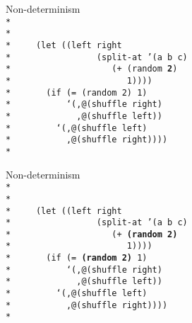 \begin{frame}{Non-determinism}
  \texttt{
    \ \\*
    \ \\*
    \ \\*
    \ \ \ \ (let ((left right\\*
    \ \ \ \ \ \ \ \ \ \ \ \ \ \ \ \ (split-at '(a b c)\\*
    \ \ \ \ \ \ \ \ \ \ \ \ \ \ \ \ \ \ \ (+ (random \textbf{2})\\*
    \ \ \ \ \ \ \ \ \ \ \ \ \ \ \ \ \ \ \ \ \ \ 1))))\\*
    \ \ \ \ \ \ (if (= (random 2) 1)\\*
    \ \ \ \ \ \ \ \ \ \ `(,@(shuffle right)\\*
    \ \ \ \ \ \ \ \ \ \ \ \ ,@(shuffle left))\\*
    \ \ \ \ \ \ \ \ `(,@(shuffle left)\\*
    \ \ \ \ \ \ \ \ \ \ ,@(shuffle right))))\\*
    \ 
    }
\end{frame}

\begin{frame}{Non-determinism}
  \texttt{
    \ \\*
    \ \\*
    \ \\*
    \ \ \ \ (let ((left right\\*
    \ \ \ \ \ \ \ \ \ \ \ \ \ \ \ \ (split-at '(a b c)\\*
    \ \ \ \ \ \ \ \ \ \ \ \ \ \ \ \ \ \ \ (+ \textbf{(random 2)}\\*
    \ \ \ \ \ \ \ \ \ \ \ \ \ \ \ \ \ \ \ \ \ \ 1))))\\*
    \ \ \ \ \ \ (if (= \textbf{(random 2)} 1)\\*
    \ \ \ \ \ \ \ \ \ \ `(,@(shuffle right)\\*
    \ \ \ \ \ \ \ \ \ \ \ \ ,@(shuffle left))\\*
    \ \ \ \ \ \ \ \ `(,@(shuffle left)\\*
    \ \ \ \ \ \ \ \ \ \ ,@(shuffle right))))\\*
    \ 
    }
\end{frame}

